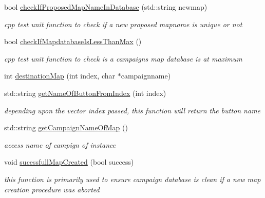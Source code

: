 \begin{DoxyCompactItemize}
bool \hyperlink{class_campaign_map_managers_a6e04b8ac8bbc2872bb0441428e0042b3}{check\+If\+Proposed\+Map\+Name\+In\+Database} (std\+::string newmap)
\begin{DoxyCompactList}\small\item\em cpp test unit function to check if a new proposed mapname is unique or not \end{DoxyCompactList}\item 
\hypertarget{class_campaign_map_managers_ab68ada5bdef5137358cb80c0ad732b79}{}\label{class_campaign_map_managers_ab68ada5bdef5137358cb80c0ad732b79} 
bool \hyperlink{class_campaign_map_managers_ab68ada5bdef5137358cb80c0ad732b79}{check\+If\+Mapdatabase\+Is\+Less\+Than\+Max} ()
\begin{DoxyCompactList}\small\item\em cpp test unit function to check is a campaigns map database is at maximum \end{DoxyCompactList}\item 
int \hyperlink{class_campaign_map_managers_a7136317d7a94280b0a0b2a3f69b18182}{destination\+Map} (int index, char $\ast$campaignname)
\item 
\hypertarget{class_campaign_map_managers_a0692f4fc3daa9afa3e7ea5739f49a1a5}{}\label{class_campaign_map_managers_a0692f4fc3daa9afa3e7ea5739f49a1a5} 
std\+::string \hyperlink{class_campaign_map_managers_a0692f4fc3daa9afa3e7ea5739f49a1a5}{get\+Name\+Of\+Button\+From\+Index} (int index)
\begin{DoxyCompactList}\small\item\em depending upon the vector index passed, this function will return the button name \end{DoxyCompactList}\item 
\hypertarget{class_campaign_map_managers_a259ac66906b4c869bcf16c8d57b50633}{}\label{class_campaign_map_managers_a259ac66906b4c869bcf16c8d57b50633} 
std\+::string \hyperlink{class_campaign_map_managers_a259ac66906b4c869bcf16c8d57b50633}{get\+Campaign\+Name\+Of\+Map} ()
\begin{DoxyCompactList}\small\item\em access name of campign of instance \end{DoxyCompactList}\item 
\hypertarget{class_campaign_map_managers_a27f019f8d7ee28286325ffca16cd0ce6}{}\label{class_campaign_map_managers_a27f019f8d7ee28286325ffca16cd0ce6} 
void \hyperlink{class_campaign_map_managers_a27f019f8d7ee28286325ffca16cd0ce6}{sucessfull\+Map\+Created} (bool success)
\begin{DoxyCompactList}\small\item\em this function is primarily used to ensure campaign database is clean if a new map creation procedure was aborted \end{DoxyCompactList}\item 

\end{DoxyCompactItemize}

